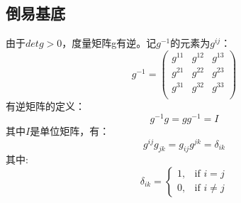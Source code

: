 \subsection{倒易基底}
由于$det g>0$，度量矩阵g有逆。记$g^{-1}$的元素为$g^{ij}$：
\begin{equation}
    g^{-1} = \left( \begin{array}{ccc}
         g^{11} & g^{12} & g^{13}  \\
         g^{21} & g^{22} & g^{23}  \\
         g^{31} & g^{32} & g^{33}  \\
    \end{array}\right)
\end{equation}
有逆矩阵的定义：
\begin{equation}
    g^{-1} g = gg^{-1} = I
\end{equation}
其中$I$是单位矩阵，有：
\begin{equation}
    g^{ij} g_{jk} = g_{ij} g^{jk} = \delta_{ik}
\end{equation}
其中:
\begin{equation}
    \delta_{ik} = \left\{ \begin{array}{rl}
         1, & \text{if } i=j  \\
         0, & \text{if } i\neq j
    \end{array}\right.
\end{equation}

